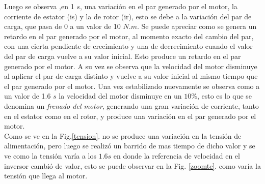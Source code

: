\documentclass[11pt, a4paper]{article}
\begin{document}
\vspace*{0.5cm}
Luego se observa ,en 1 $s$,  una variación en el par generado por el motor, la corriente de estator (is) y la de rotor (ir), esto se debe a la variación del par de carga, que pasa de 0 a un valor de 10 $N.m$. Se puede apreciar como se genera un retardo en el par generado por el motor, al momento exacto del cambio del par, con una cierta pendiente de crecimiento y una de decrecimiento cuando el valor del par de carga vuelve a su valor inicial.
Esto produce un retardo en el par generado por el motor. A su vez se observa que la velocidad del motor disminuye al aplicar el par de carga distinto y vuelve a su valor inicial al mismo tiempo que el par generado por el motor.
\vspace*{0.5cm}
Una vez estabilizado  nuevamente se observa como a un valor de 1.6 $s$ la velocidad del motor disminuye en un $10\%$, esto es lo que se denomina un \textit{frenado del motor}, generando una gran variación de corriente, tanto en el estator como en el rotor, y produce una variación en el par generado por el motor.\\
Como se ve en la Fig.\ref{tension}. no se produce una variación en la tensión de alimentación, pero luego se realizó un barrido de  mas tiempo de dicho valor y se ve como la tensión varía a los $1.6 s$ en donde la referencia de velocidad en el inversor cambió de valor, esto se puede observar en la Fig. \ref{zoomte}. como varía la tensión que llega al motor.%
\end{document}
